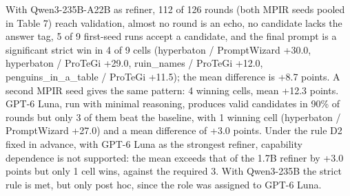 \documentclass{ieeeaccess}
\begin{document}
\begin{table}[htbp]
\centering
\footnotesize
\caption{Refiner capability on the nine Tier-1 seed-42 cells; the target stays Qwen3-1.7B. Validated is the share of rounds reaching validation. Runs changed, strict wins and the strict mean refer to the final prompt versus P0 under strict extraction; the last two columns give wins/losses and the mean difference under lenient extraction. Rows marked † pool up to three MPIR seeds, the others use MPIR seed 1 only; read the † rows as pooled and not as seed-1 results.}
\end{table}

With Qwen3-235B-A22B as refiner, 112 of 126 rounds (both MPIR seeds pooled in Table 7) reach validation, almost no round is an echo, no candidate lacks the answer tag, 5 of 9 first-seed runs accept a candidate, and the final prompt is a significant strict win in 4 of 9 cells (hyperbaton / PromptWizard +30.0, hyperbaton / ProTeGi +29.0, ruin\_\allowbreak{}names / ProTeGi +12.0, penguins\_\allowbreak{}in\_\allowbreak{}a\_\allowbreak{}table / ProTeGi +11.5); the mean difference is +8.7 points. A second MPIR seed gives the same pattern: 4 winning cells, mean +12.3 points. GPT-6 Luna, run with minimal reasoning, produces valid candidates in 90\% of rounds but only 3 of them beat the baseline, with 1 winning cell (hyperbaton / PromptWizard +27.0) and a mean difference of +3.0 points. Under the rule D2 fixed in advance, with GPT-6 Luna as the strongest refiner, capability dependence is not supported: the mean exceeds that of the 1.7B refiner by +3.0 points but only 1 cell wins, against the required 3. With Qwen3-235B the strict rule is met, but only post hoc, since the role was assigned to GPT-6 Luna.
\end{document}
